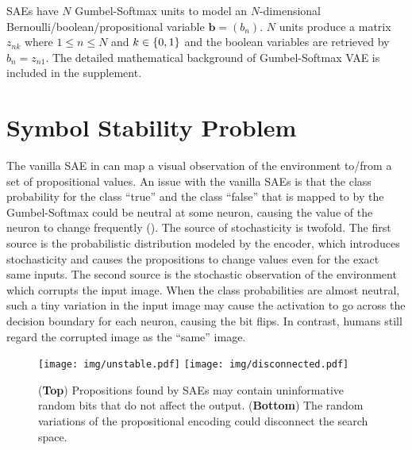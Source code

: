 SAEs have $N$ Gumbel-Softmax units
to model an $N$-dimensional Bernoulli/boolean/propositional variable $\mathbf{b}=(b_n)$.
$N$ units produce a matrix $z_{nk}$ where $1\leq n \leq N$ and $k\in{\left\{0,1\right\}}$ and
the boolean variables are retrieved by $b_n=z_{n1}$.
% 
% 
The detailed mathematical background of Gumbel-Softmax VAE is included in the supplement.



\section{Symbol Stability Problem}
\label{issues}

The vanilla SAE in \latentplanner can map a visual observation of the environment to/from a set of propositional values.
An issue with the vanilla SAEs is that the class probability for the class ``true'' and the class ``false''
that is mapped to by the Gumbel-Softmax could be neutral at some neuron,
causing the value of the neuron to change frequently ().
The source of stochasticity is twofold.
The first source is the probabilistic distribution modeled by the encoder,
which introduces stochasticity and causes the propositions to change values even for the exact same inputs.
The second source is the stochastic observation of the environment which corrupts the input image.
When the class probabilities are almost neutral,
such a tiny variation in the input image may cause the activation to go across the decision boundary for each neuron,
causing the bit flips.
In contrast, humans still regard the corrupted image as the ``same'' image.

\begin{figure}[tb]
 \centering
 \texttt{[image: img/unstable.pdf]}
 \texttt{[image: img/disconnected.pdf]}
 \caption{
(\textbf{Top}) Propositions found by SAEs may contain uninformative random bits
 that do not affect the output.
(\textbf{Bottom})
 The random variations of the propositional encoding could disconnect the search space.
}
 \label{unstable}
 \label{disconnected}
\end{figure}

